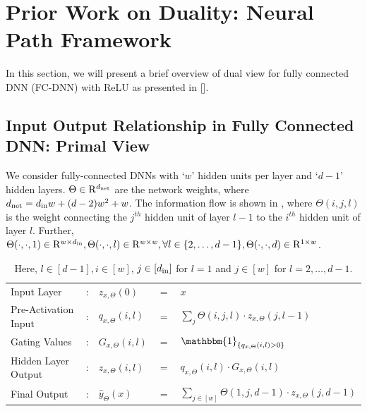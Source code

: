 \section{Prior Work on Duality: Neural Path Framework}\label{sec:dual}
In this section, we will present a brief overview of dual view for fully connected DNN (FC-DNN) with ReLU as presented in []. 

\subsection{Input Output Relationship in Fully Connected DNN: Primal View }
We consider fully-connected DNNs with `$w$' hidden units per layer and `$d-1$' hidden layers. $\Theta\in\mathrm{R}^{d_{\text{net}}}$ are the network weights, where $d_{\text{net}}=d_{\text{in}} w+(d-2)w^2+w$. The information flow is shown in , where
$\Theta(i,j,l)$ is the weight connecting the $j^{th}$ hidden unit of layer $l-1$ to the $i^{th}$ hidden unit of layer $l$. Further, $\Theta(\cdot,\cdot,1)\in\mathrm{R}^{w\times d_{\text{in}}}, \Theta(\cdot,\cdot,l)\in\mathrm{R}^{w\times w},\forall l\in\{2,\ldots,d-1\}, \Theta(\cdot,\cdot,d)\in\mathrm{R}^{1\times w}$.
\begin{table}[h]
\centering
\begin{tabular}{|l l lll|}\hline
Input Layer&: &$z_{x,\Theta}(0)$ &$=$ &$x$ \\
Pre-Activation Input&: & $q_{x,\Theta}(i,l)$& $=$ & $\sum_{j} \Theta(i,j,l)\cdot z_{x,\Theta}(j,l-1)$\\
Gating Values&: &$G_{x,\Theta}(i,l)$& $=$ & $\mathbbm{1}_{\{q_{x,\Theta}(i,l)>0\}}$\\
Hidden Layer Output&: &$z_{x,\Theta}(i,l)$ & $=$ & $q_{x,\Theta}(i,l)\cdot G_{x,\Theta}(i,l)$ \\
Final Output&: & $\hat{y}_{\Theta}(x)$ & $=$ & $\sum_{j\in[w]} \Theta(1,j,d-1)\cdot z_{x,\Theta}(j,d-1)$\\\hline
\end{tabular}
\caption{Here, $l\in[d-1],i\in[w]$, $j\in[d_{\text{in}}]$ for $l=1$ and $j\in[w]$ for $l=2,\ldots,d-1$.} 
\label{tb:basic}
\end{table}


